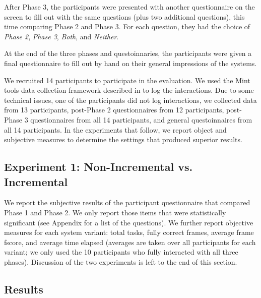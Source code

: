 \documentclass[11pt]{article}
\begin{document}
After Phase 3, the participants were presented with another questionnaire on the screen to fill out with the same questions (plus two additional questions), this time comparing Phase 2 and Phase 3. For each question, they had the choice of \emph{Phase 2}, \emph{Phase 3}, \emph{Both}, and \emph{Neither}.

At the end of the three phases and questoinnaries, the participants were given a final questionnaire to fill out by hand on their general impressions of the systems. 

We recruited 14 participants to participate in the evaluation. We used the Mint tools data collection framework described in \cite{kousidis2012evaluating} to log the interactions. Due to some technical issues, one of the participants did not log interactions, we collected data from 13 participants, post-Phase 2 questionnaires from 12 participants,  post-Phase 3 questionnaires from all 14 participants, and general questoinnaires from all 14 participants. In the experiments that follow, we report object and subjective measures to determine the settings that produced superior results.


\subsection{Experiment 1: Non-Incremental vs. Incremental}
\label{section:exp1}

We report the subjective results of the participant questionnaire that compared Phase 1 and Phase 2. We only report those items that were statistically significant (see Appendix for a list of the questions). We further report objective measures for each system variant: total tasks, fully correct frames, average frame fscore, and average time elapsed (averages are taken over all participants for each variant; we only used the 10 participants who fully interacted with all three phases). Discussion of the two experiments is left to the end of this section.

\subsection{Results}
\end{document}
